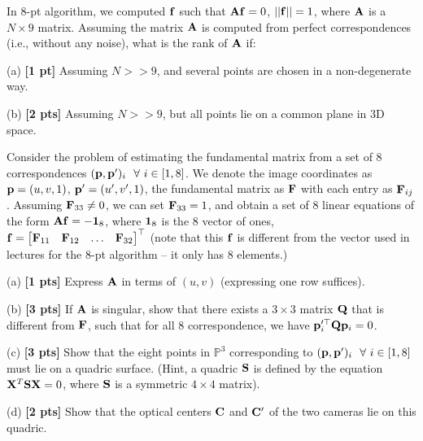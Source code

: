 \documentclass[11pt,addpoints,answers]{exam}
\numberwithin{equation}{section} %
\numberwithin{figure}{section} %
\numberwithin{table}{section} %
\begin{document}
\begin{questions}
\question In $8$-pt algorithm, we computed $\mathbf{f}$ such that $\mathbf{A}\mathbf{f} = 0$, $||\mathbf{f}|| = 1$, where $\mathbf{A}$ is a $N \times 9$ matrix. Assuming the matrix $\mathbf{A}$ is computed from perfect correspondences (i.e., without any noise), what is the rank of $\mathbf{A}$ if:

(a) \textbf{[1 pt]} Assuming $N >> 9$, and several points are chosen in a non-degenerate way.

(b) \textbf{[2 pts]} Assuming $N >> 9$, but all points lie on a common plane in 3D space.

\begin{tcolorbox}[fit,height=5cm, width=\textwidth, blank, borderline={0.5pt}{-2pt},halign=left, valign=center, nobeforeafter]


\end{tcolorbox}

\question Consider the problem of estimating the fundamental matrix from a set of 8 correspondences $(\mathbf{p}, \mathbf{p}^\prime)_i~~\forall~ i \in [1, 8]$. We denote the image coordinates as $\mathbf{p} = (u, v, 1)$, $\mathbf{p}' = (u', v', 1)$, the fundamental matrix as $\mathbf{F}$ with each entry as $\mathbf{F}_{ij}$. Assuming $\mathbf{F}_{33} \neq 0$, we can set $\mathbf{F}_{33} = 1$, and obtain a set of 8 linear equations of the form $\mathbf{A} \mathbf{f} = -\boldsymbol{1}_8$, where $\boldsymbol{1}_8$ is the 8 vector of ones, $\mathbf{f} = \begin{bmatrix} \mathbf{F}_{11} & \mathbf{F}_{12} & \dots & \mathbf{F}_{32} \end{bmatrix}^\top$ (note  that this $\mathbf{f}$ is different from the vector used in lectures for the 8-pt algorithm -- it only has 8 elements.)

(a) \textbf{[1 pts]} Express $\mathbf{A}$ in terms of $(u, v)$ (expressing one row suffices).
        
(b) \textbf{[3 pts]} If $\mathbf{A}$ is singular, show that there exists a $3 \times 3$ matrix $\mathbf{Q}$ that is different from $\mathbf{F}$, such that for all $8$ correspondence, we have $\mathbf{p}_i^{\prime\top} \mathbf{Q} \mathbf{p}_i = 0$.

(c) \textbf{[3 pts]} Show that the eight points in $\mathbb{P}^3$ corresponding to $(\mathbf{p}, \mathbf{p}^\prime)_i~~\forall~ i \in [1, 8]$ must lie on a quadric surface. (Hint, a quadric $\mathbf{S}$ is defined by the equation $\mathbf{X}^T\mathbf{S}\mathbf{X} = 0$, where $\mathbf{S}$ is a symmetric $4 \times 4$ matrix).

(d) \textbf{[2 pts]} Show that the optical centers $\mathbf{C}$ and $\mathbf{C}^\prime$ of the two cameras lie on this quadric.

\begin{tcolorbox}[fit,height=12cm, width=\linewidth, blank, borderline={0.5pt}{-2pt},halign=center, nobeforeafter]
\end{tcolorbox}


\end{questions}
\end{document}

